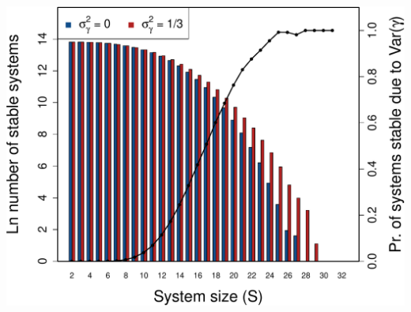 \documentclass[]{article}
\begin{document}
\includegraphics{ms_files/figure-latex/unnamed-chunk-15-1.pdf}
\end{document}
